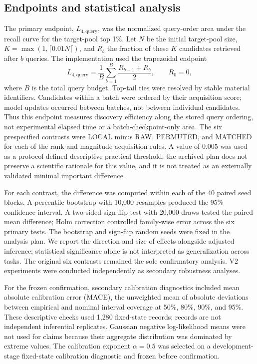 \documentclass[11pt]{article}
\newcommand{\Lfourq}{\ensuremath{L_{4,\mathrm{query}}}\xspace}
\begin{document}
\subsection{Endpoints and statistical analysis}
The primary endpoint, \Lfourq, was the normalized query-order area under the recall curve for the target-pool top 1\%. Let \(N\) be the initial target-pool size, \(K=\max(1,\lceil0.01N\lceil)\), and \(R_b\) the fraction of these \(K\) candidates retrieved after \(b\) queries. The implementation used the trapezoidal endpoint
\begin{equation}
 L_{4,\mathrm{query}}=\frac{1}{B}\sum_{b=1}^{B}\frac{R_{b-1}+R_b}{2},\qquad R_0=0,
\end{equation}
where \(B\) is the total query budget. Top-tail ties were resolved by stable material identifiers. Candidates within a batch were ordered by their acquisition score; model updates occurred between batches, not between individual candidates. Thus this endpoint measures discovery efficiency along the stored query ordering, not experimental elapsed time or a batch-checkpoint-only area. The six prespecified contrasts were LOCAL minus RAW, PERMUTED, and MATCHED for each of the rank and magnitude acquisition rules. A value of 0.005 was used as a protocol-defined descriptive practical threshold; the archived plan does not preserve a scientific rationale for this value, and it is not treated as an externally validated minimal important difference.

For each contrast, the difference was computed within each of the 40 paired seed blocks. A percentile bootstrap with 10,000 resamples produced the 95\% confidence interval. A two-sided sign-flip test with 20,000 draws tested the paired mean difference; Holm correction controlled family-wise error across the six primary tests. The bootstrap and sign-flip random seeds were fixed in the analysis plan. We report the direction and size of effects alongside adjusted inference; statistical significance alone is not interpreted as generalization across tasks. The original six contrasts remained the sole confirmatory analysis. V2 experiments were conducted independently as secondary robustness analyses.

For the frozen confirmation, secondary calibration diagnostics included mean absolute calibration error (MACE), the unweighted mean of absolute deviations between empirical and nominal interval coverage at 50\%, 80\%, 90\%, and 95\%. These descriptive checks used 1,280 fixed-state records; records are not independent inferential replicates. Gaussian negative log-likelihood means were not used for claims because their aggregate distribution was dominated by extreme values. The calibration exponent \(\alpha=0.5\) was selected on a development-stage fixed-state calibration diagnostic and frozen before confirmation.
\end{document}
